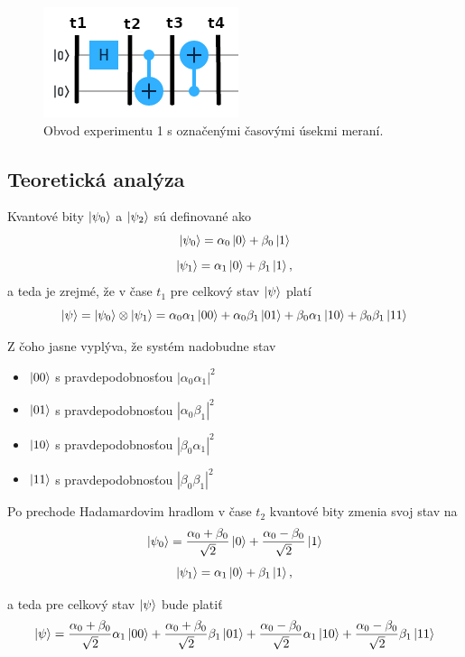 \begin{figure} 
	\centering 
	\includegraphics[width=.6\textwidth]{figures/expr1_circuit.png} 
	\caption{Obvod experimentu 1 s označenými časovými úsekmi meraní.}
    \label{expr1_circuit}
\end{figure}

\subsection*{Teoretická analýza}
Kvantové bity \(\ket{\psi_0}\) a \(\ket{\psi_2}\) sú definované ako 
\[\ket{\psi_0} = \alpha_0\ket{0} + \beta_0\ket{1}\]
\[\ket{\psi_1} = \alpha_1\ket{0} + \beta_1\ket{1},\]
a teda je zrejmé, že v čase \(t_1\) pre celkový stav \(\ket{\psi}\) platí 
\[\ket{\psi} = \ket{\psi_0} \otimes \ket{\psi_1} = \alpha_0\alpha_1\ket{00} + \alpha_0\beta_1\ket{01} + \beta_0\alpha_1\ket{10} + \beta_0\beta_1\ket{11}\]

Z čoho jasne vyplýva, že systém nadobudne stav
    \begin{itemize}
        \item[] \(\ket{00}\) s pravdepodobnosťou \(|\alpha_0\alpha_1 |^2\)
        \item[] \(\ket{01}\) s pravdepodobnosťou \(| \alpha_0\beta_1 |^2\)
        \item[] \(\ket{10}\) s pravdepodobnosťou \(| \beta_0\alpha_1 |^2\)
        \item[] \(\ket{11}\) s pravdepodobnosťou \(| \beta_0\beta_1 |^2\) 
    \end{itemize}

Po prechode Hadamardovim hradlom v čase \(t_2\) kvantové bity zmenia svoj stav
 na
\[\ket{\psi_0} = \frac{\alpha_0 + \beta_0}{\sqrt{2}}\ket{0} + \frac{\alpha_0 - \beta_0}{\sqrt{2}}\ket{1}\]
\[\ket{\psi_1} = \alpha_1\ket{0} + \beta_1\ket{1},\]

a teda pre celkový stav \(\ket{\psi}\) bude platiť
\[\ket{\psi} = \frac{\alpha_0 + \beta_0}{\sqrt{2}}\alpha_1\ket{00} + \frac{\alpha_0 + \beta_0}{\sqrt{2}}\beta_1\ket{01} + \frac{\alpha_0 - \beta_0}{\sqrt{2}}\alpha_1\ket{10} + \frac{\alpha_0 - \beta_0}{\sqrt{2}}\beta_1\ket{11}\]

